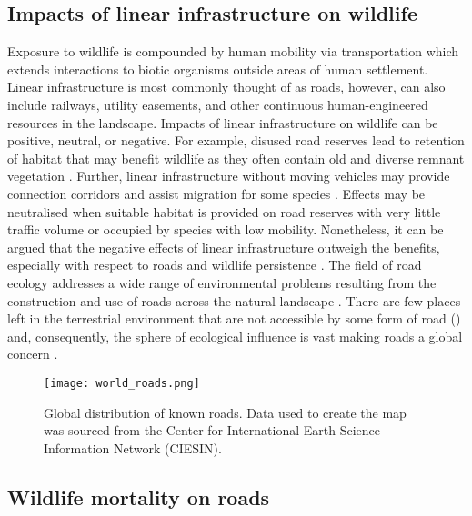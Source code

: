 \subsection{Impacts of linear infrastructure on wildlife}

Exposure to wildlife is compounded by human mobility via transportation which extends interactions to biotic organisms outside areas of human settlement. Linear infrastructure is most commonly thought of as roads, however, can also include railways, utility easements, and other continuous human-engineered resources in the landscape. Impacts of linear infrastructure on wildlife can be positive, neutral, or negative. For example, disused road reserves lead to retention of habitat that may benefit wildlife as they often contain old and diverse remnant vegetation \citep{benn91}. Further, linear infrastructure without moving vehicles may provide connection corridors and assist migration for some species \citep{rvdr15}. Effects may be neutralised when suitable habitat is provided on road reserves with very little traffic volume or occupied by species with low mobility. Nonetheless, it can be argued that the negative effects of linear infrastructure outweigh the benefits, especially with respect to roads and wildlife persistence \citep{fahr09}.
The field of road ecology addresses a wide range of environmental problems resulting from the construction and use of roads across the natural landscape \citep{form03,rvdr15}. There are few places left in the terrestrial environment that are not accessible by some form of road () and, consequently, the sphere of ecological influence is vast making roads a global concern \citep{laur14}.

\begin{figure*}[htp]
  \centering
  \texttt{[image: world\_roads.png]}
  \caption[Global distribution of known roads]{Global distribution of known roads. Data used to create the map was sourced from the Center for International Earth Science Information Network (CIESIN).}
  \label{roads}
\end{figure*}

\subsection{Wildlife mortality on roads}

